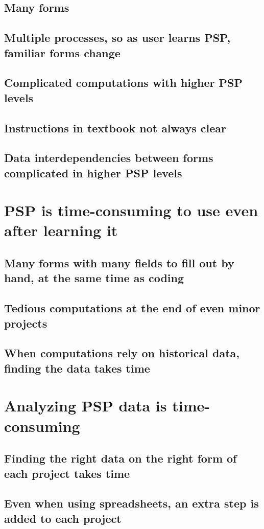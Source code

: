\subsection{Many forms}
\subsection{Multiple processes, so as user learns PSP, familiar forms change}
\subsection{Complicated computations with higher PSP levels}
\subsection{Instructions in textbook not always clear}
\subsection{Data interdependencies between forms complicated in higher PSP levels}
\section{PSP is time-consuming to use even after learning it}
\subsection{Many forms with many fields to fill out by hand, at the same time as coding}
\subsection{Tedious computations at the end of even minor projects}
\subsection{When computations rely on historical data, finding the data takes time}
\section{Analyzing PSP data is time-consuming}
\subsection{Finding the right data on the right form of each project takes time}
\subsection{Even when using spreadsheets, an extra step is added to each project}
